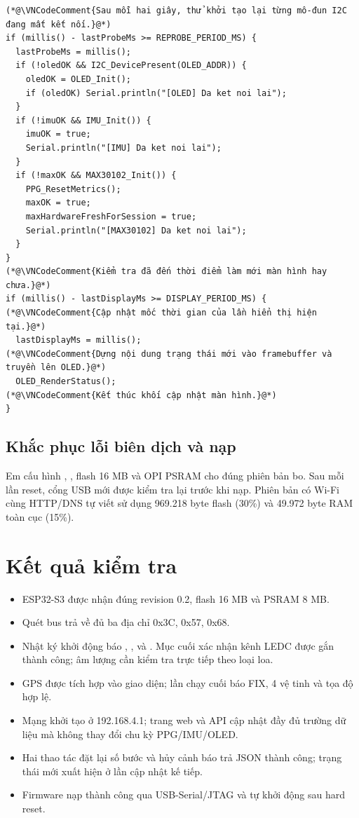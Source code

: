\documentclass[12pt]{article}
\begin{document}
\begin{lstlisting}[style=firmware,caption={Các tác vụ có chu kỳ độc lập trong vòng lặp chính}]
(*@\VNCodeComment{Sau mỗi hai giây, thử khởi tạo lại từng mô-đun I2C đang mất kết nối.}@*)
if (millis() - lastProbeMs >= REPROBE_PERIOD_MS) {
  lastProbeMs = millis();
  if (!oledOK && I2C_DevicePresent(OLED_ADDR)) {
    oledOK = OLED_Init();
    if (oledOK) Serial.println("[OLED] Da ket noi lai");
  }
  if (!imuOK && IMU_Init()) {
    imuOK = true;
    Serial.println("[IMU] Da ket noi lai");
  }
  if (!maxOK && MAX30102_Init()) {
    PPG_ResetMetrics();
    maxOK = true;
    maxHardwareFreshForSession = true;
    Serial.println("[MAX30102] Da ket noi lai");
  }
}
(*@\VNCodeComment{Kiểm tra đã đến thời điểm làm mới màn hình hay chưa.}@*)
if (millis() - lastDisplayMs >= DISPLAY_PERIOD_MS) {
(*@\VNCodeComment{Cập nhật mốc thời gian của lần hiển thị hiện tại.}@*)
  lastDisplayMs = millis();
(*@\VNCodeComment{Dựng nội dung trạng thái mới vào framebuffer và truyền lên OLED.}@*)
  OLED_RenderStatus();
(*@\VNCodeComment{Kết thúc khối cập nhật màn hình.}@*)
}
\end{lstlisting}

\subsection{Khắc phục lỗi biên dịch và nạp}

Em cấu hình , , flash 16 MB và OPI PSRAM cho đúng phiên bản bo. Sau mỗi lần reset, cổng USB mới được kiểm tra lại trước khi nạp. Phiên bản có Wi-Fi cùng HTTP/DNS tự viết sử dụng 969.218 byte flash (30\%) và 49.972 byte RAM toàn cục (15\%).

\section{Kết quả kiểm tra}

\begin{evidencebox}
\begin{itemize}
  \item ESP32-S3 được nhận đúng revision 0.2, flash 16 MB và PSRAM 8 MB.
  \item Quét bus trả về đủ ba địa chỉ 0x3C, 0x57, 0x68.
  \item Nhật ký khởi động báo , ,  và . Mục cuối xác nhận kênh LEDC được gắn thành công; âm lượng cần kiểm tra trực tiếp theo loại loa.
  \item GPS được tích hợp vào giao diện; lần chạy cuối báo FIX, 4 vệ tinh và tọa độ hợp lệ.
  \item Mạng  khởi tạo ở 192.168.4.1; trang web và API cập nhật đầy đủ trường dữ liệu mà không thay đổi chu kỳ PPG/IMU/OLED.
  \item Hai thao tác đặt lại số bước và hủy cảnh báo trả JSON thành công; trạng thái mới xuất hiện ở lần cập nhật kế tiếp.
  \item Firmware nạp thành công qua USB-Serial/JTAG và tự khởi động sau hard reset.
\end{itemize}
\end{evidencebox}
\end{document}

